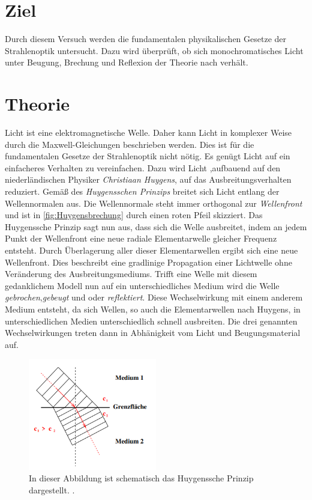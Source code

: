 \section{Ziel}
\label{sec:Ziel}
Durch diesem Versuch werden die fundamentalen physikalischen Gesetze der Strahlenoptik untersucht. Dazu wird überprüft, ob sich monochromatisches Licht unter Beugung, Brechung 
und Reflexion der Theorie nach verhält.

\section{Theorie}
\label{sec:Theorie}
Licht ist eine elektromagnetische Welle. Daher kann Licht in komplexer Weise durch die Maxwell-Gleichungen beschrieben werden. Dies ist für die fundamentalen Gesetze der
Strahlenoptik nicht nötig. Es genügt Licht auf ein einfacheres Verhalten zu vereinfachen. Dazu wird Licht ,aufbauend auf den niederländischen Physiker 
\textit{Christiaan Huygens}, auf das Ausbreitungsverhalten reduziert. Gemäß des \textit{Huygensschen Prinzips} breitet sich Licht entlang der Wellennormalen aus. Die 
Wellennormale steht immer orthogonal zur \textit{Wellenfront} und ist in \autoref{fig:Huygensbrechung} durch einen roten Pfeil skizziert. Das Huygenssche Prinzip sagt nun aus,
dass sich die Welle ausbreitet, indem an jedem Punkt der Wellenfront eine neue radiale Elementarwelle gleicher Frequenz entsteht. Durch Überlagerung aller dieser Elementarwellen 
ergibt sich eine neue Wellenfront. Dies beschreibt eine gradlinige Propagation einer Lichtwelle ohne Veränderung des Ausbreitungsmediums. Trifft eine Welle mit diesem 
gedanklichem Modell nun auf ein unterschiedliches Medium wird die Welle \textit{gebrochen},\textit{gebeugt} und oder \textit{reflektiert}. Diese Wechselwirkung mit einem
anderem Medium entsteht, da sich Wellen, so auch die Elementarwellen nach Huygens, in unterschiedlichen Medien unterschiedlich schnell ausbreiten. Die drei genannten 
Wechselwirkungen treten dann in Abhänigkeit vom Licht und Beugungsmaterial auf. 

\begin{figure}
    \centering
    \includegraphics[width=0.5\textwidth]{content/HuygensscheBrechung.png}
    \caption{In dieser Abbildung ist schematisch das Huygenssche Prinzip dargestellt. \cite{v400}.}
    \label{fig:Huygensbrechung}
\end{figure}

